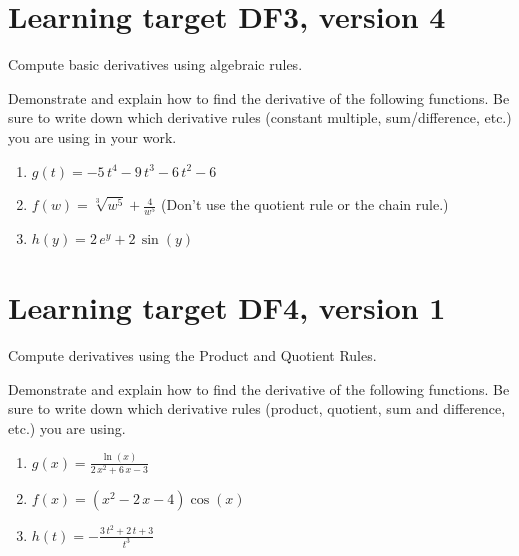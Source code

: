 \pagebreak

\section{Learning target DF3, version 4}

Compute basic derivatives using algebraic rules.

\hrulefill

Demonstrate and explain how to find the derivative of the following functions. Be sure to write down which derivative rules (constant multiple, sum/difference, etc.) you are using in your work.

\begin{enumerate}
    \item \(g(t) = -5 \, t^{4} - 9 \, t^{3} - 6 \, t^{2} - 6\)
    \vfill
    \item \(f(w) = \sqrt[3]{w^5} + \frac{4}{w^{5}}\)  \quad (Don't use the quotient rule or the chain rule.)
    \vfill
    \item \(h(y) = 2 \, e^{y} + 2 \, \sin\left(y\right)\)
    \vfill
\end{enumerate}

\pagebreak

\section{Learning target DF4, version 1}

Compute derivatives using the Product and Quotient Rules.

\hrulefill

Demonstrate and explain how to find the derivative of the following functions. Be sure to write down which derivative rules (product, quotient, sum and difference, etc.) you are using.

\begin{enumerate}
    \item \(\renewcommand{\log}{\ln} g(x)= \frac{\log\left(x\right)}{2 \, x^{2} + 6 \, x - 3}\)
    \vfill
    \item \(\renewcommand{\log}{\ln} f(x)= {\left(x^{2} - 2 \, x - 4\right)} \cos\left(x\right)\)
    \vfill
    \item \(\renewcommand{\log}{\ln} h(t)= -\frac{3 \, t^{2} + 2 \, t + 3}{t^{3}}\)
    \vfill
\end{enumerate}



